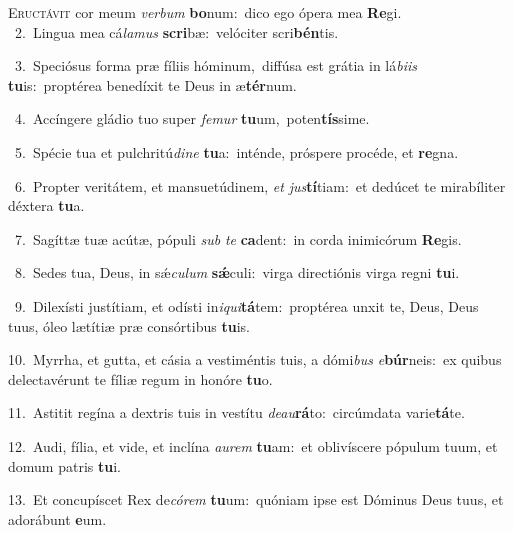 \lettrine{\initial\textcolor{\initialcolor}{E}}{ructávit} cor meum \textit{ver}\-\textit{bum} \textbf{bo}\-num:~\star dico ego ópera mea \textbf{Re}\-gi.\\
{\numbfont\textcolor{\numbcolor}{~2.}}~Lingua mea cá\-\textit{la}\-\textit{mus} \textbf{scri}\-bæ:~\star velóciter scri\-\textbf{bén}\-tis.\par
{\numbfont\textcolor{\numbcolor}{~3.}}~Speciósus forma præ fíliis hóminum,~\dagger diffúsa est grátia in lá\-\textit{bi}\-\textit{is} \textbf{tu}\-is:~\star proptérea benedíxit te Deus in æ\-\textbf{tér}\-num.\par
{\numbfont\textcolor{\numbcolor}{~4.}}~Accíngere gládio tuo super \textit{fe}\-\textit{mur} \textbf{tu}\-um,~\star poten\-\textbf{tís}\-sime.\par
{\numbfont\textcolor{\numbcolor}{~5.}}~Spécie tua et pulchritú\-\textit{di}\-\textit{ne} \textbf{tu}\-a:~\star inténde, próspere procéde, et \textbf{re}\-gna.\par
{\numbfont\textcolor{\numbcolor}{~6.}}~Propter veritátem, et mansuetúdinem, \textit{et} \textit{jus}\-\textbf{tí}tiam:~\star et dedúcet te mirabíliter déxtera \textbf{tu}\-a.\par
{\numbfont\textcolor{\numbcolor}{~7.}}~Sagíttæ tuæ acútæ, pópuli \textit{sub} \textit{te} \textbf{ca}\-dent:~\star in corda inimicórum \textbf{Re}\-gis.\par
{\numbfont\textcolor{\numbcolor}{~8.}}~Sedes tua, Deus, in sǽ\-\textit{cu}\-\textit{lum} \textbf{sǽ}\-culi:~\star virga directiónis virga regni \textbf{tu}\-i.\par
{\numbfont\textcolor{\numbcolor}{~9.}}~Dilexísti justítiam, et odísti in\-\textit{i}\-\textit{qui}\textbf{tá}tem:~\star proptérea unxit te, Deus, Deus tuus, óleo lætítiæ præ consórtibus \textbf{tu}\-is.\par
{\numbfont\textcolor{\numbcolor}{10.}}~Myrrha, et gutta, et cásia a vestiméntis tuis, a dómi\textit{bus} \textit{e}\-\textbf{búr}neis:~\star ex quibus delectavérunt te fíliæ regum in honóre \textbf{tu}\-o.\par
{\numbfont\textcolor{\numbcolor}{11.}}~Astitit regína a dextris tuis in vestítu \textit{de}\-\textit{au}\textbf{rá}to:~\star circúmdata varie\-\textbf{tá}\-te.\par
{\numbfont\textcolor{\numbcolor}{12.}}~Audi, fília, et vide, et inclína \textit{au}\-\textit{rem} \textbf{tu}\-am:~\star et oblivíscere pópulum tuum, et domum patris \textbf{tu}\-i.\par
{\numbfont\textcolor{\numbcolor}{13.}}~Et concupíscet Rex de\-\textit{có}\-\textit{rem} \textbf{tu}\-um:~\star quóniam ipse est Dóminus Deus tuus, et adorábunt \textbf{e}\-um.\par
